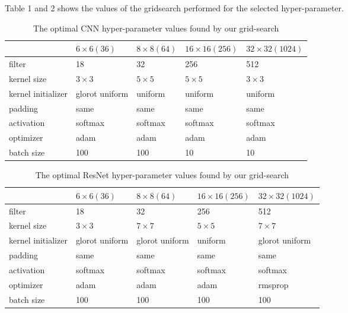 Table 1 and 2 shows the values of the gridsearch performed for the selected hyper-parameter.
\begin{table}
\caption{The optimal CNN hyper-parameter values found by our grid-search}
\setlength{\tabcolsep}{3pt}
\begin{tabular}{|p{50pt}|p{35pt}|p{35pt}|p{47pt}|p{48pt}|}
\hline
 & $6 \times 6 (36)$ & $8 \times 8 (64)$ & $16 \times 16 (256)$ & $32 \times 32 (1024)$ \\
\hline
\hline
filter & 18 & 32 & 256 & 512 \\
\hline
kernel size & $3 \times 3$ & $5 \times 5$ & $5 \times 5$ & $3 \times 3$ \\
\hline
kernel initializer & glorot uniform & uniform & uniform & uniform  \\
\hline
padding & same & same & same & same  \\
\hline
activation & softmax & softmax & softmax & softmax \\
\hline
optimizer & adam & adam & adam & adam \\
\hline
batch size & 100 & 100 & 10 & 10 \\
\hline
\end{tabular}
\label{tab1}
\end{table}

\begin{table}
\caption{The optimal ResNet hyper-parameter values found by our grid-search}
\setlength{\tabcolsep}{3pt}
\begin{tabular}{|p{50pt}|p{35pt}|p{35pt}|p{47pt}|p{48pt}|}
\hline
 & $6 \times 6 (36)$ & $8 \times 8 (64)$ & $16 \times 16 (256)$ & $32 \times 32 (1024)$ \\
\hline
\hline
filter & 18 & 32 & 256 & 512 \\
\hline
kernel size & $3 \times 3$ & $7 \times 7$ & $5 \times 5$ & $7 \times 7$ \\
\hline
kernel initializer & glorot uniform & glorot uniform & uniform & glorot uniform  \\
\hline
padding & same & same & same & same  \\
\hline
activation & softmax & softmax & softmax & softmax \\
\hline
optimizer & adam & adam & adam & rmsprop \\
\hline
batch size & 100 & 100 & 100 & 100 \\
\hline
\end{tabular}
\label{tab2}
\end{table}

